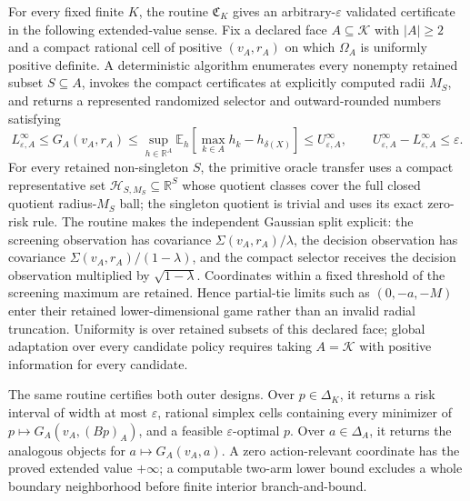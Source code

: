 For every fixed finite \(K\), the routine \(\mathfrak C_K\) gives an arbitrary-\(\varepsilon\) validated certificate in the following extended-value sense.  Fix a declared face \(A\subseteq\mathcal K\) with \(|A|\geq2\) and a compact rational cell of positive \((v_A,r_A)\) on which \(\Omega_A\) is uniformly positive definite.  A deterministic algorithm enumerates every nonempty retained subset \(S\subseteq A\), invokes the compact certificates at explicitly computed radii \(M_S\), and returns a represented randomized selector and outward-rounded numbers satisfying
\[
L^{\infty}_{\varepsilon,A}\leq G_A(v_A,r_A)
\leq \sup_{h\in\mathbb R^A}\mathbb E_h\!\left[\max_{k\in A}h_k-h_{\delta(X)}\right]
\leq U^{\infty}_{\varepsilon,A},
\qquad U^{\infty}_{\varepsilon,A}-L^{\infty}_{\varepsilon,A}\leq\varepsilon.
\]
For every retained non-singleton \(S\), the primitive oracle transfer uses a compact representative set \(\mathscr H_{S,M_S}\subseteq\mathbb R^S\) whose quotient classes cover the full closed quotient radius-\(M_S\) ball; the singleton quotient is trivial and uses its exact zero-risk rule.  The routine makes the independent Gaussian split explicit: the screening observation has covariance \(\Sigma(v_A,r_A)/\lambda\), the decision observation has covariance \(\Sigma(v_A,r_A)/(1-\lambda)\), and the compact selector receives the decision observation multiplied by \(\sqrt{1-\lambda}\).  Coordinates within a fixed threshold of the screening maximum are retained.  Hence partial-tie limits such as \((0,-a,-M)\) enter their retained lower-dimensional game rather than an invalid radial truncation.  Uniformity is over retained subsets of this declared face; global adaptation over every candidate policy requires taking \(A=\mathcal K\) with positive information for every candidate.

The same routine certifies both outer designs.  Over \(p\in\Delta_K\), it returns a risk interval of width at most \(\varepsilon\), rational simplex cells containing every minimizer of \(p\mapsto G_A(v_A,(Bp)_A)\), and a feasible \(\varepsilon\)-optimal \(p\).  Over \(a\in\Delta_A\), it returns the analogous objects for \(a\mapsto G_A(v_A,a)\).  A zero action-relevant coordinate has the proved extended value \(+\infty\); a computable two-arm lower bound excludes a whole boundary neighborhood before finite interior branch-and-bound.

